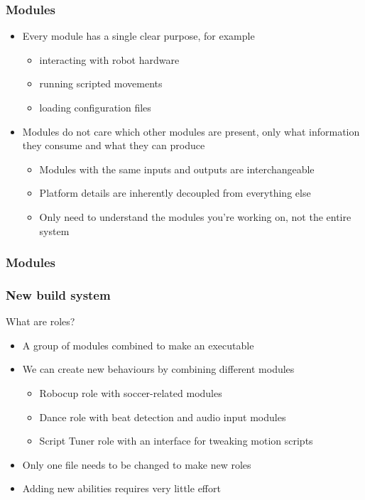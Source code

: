 \documentclass{beamer}
\begin{document}
\begin{frame}
	\frametitle{Modules}

	\begin{itemize}
		\item Every module has a single clear purpose, for example
		\begin{itemize}
			\item interacting with robot hardware
			\item running scripted movements
			\item loading configuration files
		\end{itemize}
		\item Modules do not care which other modules are present, only what information they consume and what they can produce
		\begin{itemize}
			\item Modules with the same inputs and outputs are interchangeable
			\item Platform details are inherently decoupled from everything else
			\item Only need to understand the modules you're working on, not the entire system
		\end{itemize}
	\end{itemize}
\end{frame}

\begin{frame}
	\frametitle{Modules}

\end{frame}

\begin{frame}
	\frametitle{New build system}

	What are roles?
	\begin{itemize}
		\item A group of modules combined to make an executable
		\item We can create new behaviours by combining different modules
		\begin{itemize}
			\item Robocup role with soccer-related modules
			\item Dance role with beat detection and audio input modules
			\item Script Tuner role with an interface for tweaking motion scripts
		\end{itemize}
		\item Only one file needs to be changed to make new roles
		\item Adding new abilities requires very little effort
	\end{itemize}
\end{frame}
\end{document}
